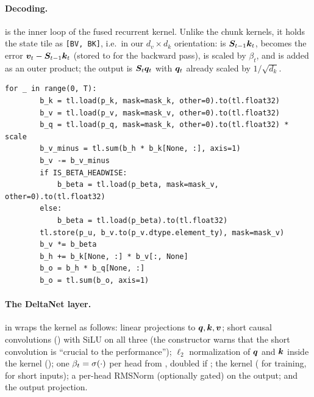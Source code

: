\begin{sloppypar}
\paragraph{Decoding.}
 is the inner loop of the fused recurrent kernel. Unlike the chunk
kernels, it holds the state tile as \texttt{[BV, BK]}, i.e.\ in our $d_v\times d_k$ orientation:
 is $\bm{S}_{t-1}\bm{k}_t$,  becomes the error $\bm{v}_t-\bm{S}_{t-1}\bm{k}_t$ (stored
to  for the backward pass), is scaled by $\beta_t$, and is added as an outer product; the
output is $\bm{S}_t\bm{q}_t$ with $\bm{q}_t$ already scaled by $1/\sqrt{d_k}$.

\begin{lstlisting}[caption={Excerpt from \texttt{repos/\allowbreak fla-org\_\_flash-linear-attention/\allowbreak fla/\allowbreak ops/\allowbreak delta\_rule/\allowbreak fused\_recurrent.py} (kernel \texttt{fused\_recurrent\_delta\_rule\_fwd\_kernel}).},label={lst:c03-fla-delta-rec}]
    for _ in range(0, T):
        b_k = tl.load(p_k, mask=mask_k, other=0).to(tl.float32)
        b_v = tl.load(p_v, mask=mask_v, other=0).to(tl.float32)
        b_q = tl.load(p_q, mask=mask_k, other=0).to(tl.float32) * scale
        b_v_minus = tl.sum(b_h * b_k[None, :], axis=1)
        b_v -= b_v_minus
        if IS_BETA_HEADWISE:
            b_beta = tl.load(p_beta, mask=mask_v, other=0).to(tl.float32)
        else:
            b_beta = tl.load(p_beta).to(tl.float32)
        tl.store(p_u, b_v.to(p_v.dtype.element_ty), mask=mask_v)
        b_v *= b_beta
        b_h += b_k[None, :] * b_v[:, None]
        b_o = b_h * b_q[None, :]
        b_o = tl.sum(b_o, axis=1)
\end{lstlisting}

\paragraph{The DeltaNet layer.}
 in 
wraps the kernel as follows: linear projections to $\bm{q},\bm{k},\bm{v}$; short causal convolutions
() with SiLU on all three (the constructor warns that the short convolution is
``crucial to the performance''); $\ell_2$ normalization of $\bm{q}$ and $\bm{k}$ inside the kernel
(); one $\beta_t=\sigma(\cdot)$ per head from , doubled if
; the kernel ( for training,  for short
inputs); a per-head RMSNorm (optionally gated) on the output; and the output projection.


\end{sloppypar}
